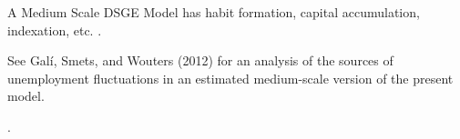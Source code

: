 \documentclass[
thesis.tex
]{subfiles}
\begin{document}
\begin{comment}

\begin{definition}[Canonical NK Model]
	
	\cite[Lecture 13, p.7]{solis-garcia_ucb_2022}
	
	3.1.2 Back to the pricing equation:
	
	log-linearize the left hand equation:
	\begin{align*}
		&\mathbb{E}_t \sum_{s=0}^{\infty} 
		\left[ 
		\left( \frac{\theta}{1+R} \right)^s
		\left( \frac{P_t^\ast Y_{t+s}(j)}{1 + \frac{1}{1+R}
			\sum_{k=0}^{s-1} \widetilde{R}_{t+k}} \right) 
		\right]
		\implies \\
		&\mathbb{E}_t \sum_{s=0}^{\infty} 
		\left[ 
		\left( \frac{\theta}{1+R} \right)^s
		\left( \frac{P^\ast Y(j)(1+\widehat{P}_t^\ast + \widehat{Y}_{t+s}(j))}{1 + \frac{1}{1+R}
			\sum_{k=0}^{s-1} \widetilde{R}_{t+k}} \right) 
		\right] \implies \\
		&\mathbb{E}_t \sum_{s=0}^{\infty} 
		\left[ 
		\left( \frac{\theta}{1+R} \right)^s
		\left( \frac{P_t^\ast Y_{t+s}(j)}{\frac{(1+R)+\sum_{k=0}^{s-1} \widetilde{R}_{t+k}}{1+R}} \right) 
		\right]
		\implies \\
		&\mathbb{E}_t \sum_{s=0}^{\infty} 
		\left[ 
		\left( \frac{\theta}{1+R} \right)^s
		\left( \frac{P_t^\ast Y_{t+s}(j)(1+R)}{(1+R)+\sum_{k=0}^{s-1} \widetilde{R}_{t+k}} \right) 
		\right]
		\implies \\
		&\mathbb{E}_t \sum_{s=0}^{\infty} 
		\left[ 
		\left( \frac{\theta}{1+R} \right)^s
		\left( \frac{P^\ast Y(j)(1+\widehat{P}_t^\ast + \widehat{Y}_{t+s}(j))(1+R)}{(1+R)+\sum_{k=0}^{s-1} \widetilde{R}_{t+k}} \right) 
		\right]
	\end{align*}
	
\end{definition}

\end{comment}

\begin{definition}
	A Medium Scale DSGE Model has habit formation, capital accumulation, indexation, etc. \cite[p.208]{gali_monetary_2015}. 
	
	See Galí, Smets, and Wouters (2012) for an analysis of the sources of unemployment fluctuations in an estimated medium-scale version of the present model.
\end{definition}

\begin{definition}
	\cite[Lecture 5, p.3]{solis-garcia_ucb_2022}.
\end{definition}
\end{document}
